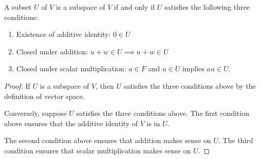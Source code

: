 A subset $U$ of $V$ is a subspace of $V$ if and only if $U$ satisfies the following three conditions:
\begin{enumerate}
\item Existence of additive identity: $0 \in U$
\item Closed under addition: $u+w \in U \implies u+w \in U$
\item Closed under scalar multiplication: $a \in F$ and $u \in U$ implies $au \in U$.
\end{enumerate}
\begin{proof}
If $U$ is a subspace of $V$, then $U$ satisfies the three conditions above by the definition of vector space.

Conversely, suppose $U$ satisfies the three conditions above. The first condition above ensures that the additive identity of $V$ is in $U$.

The second condition above ensures that addition makes sense on $U$. The third condition ensures that scalar multiplication makes sense on $U$.
\end{proof}

